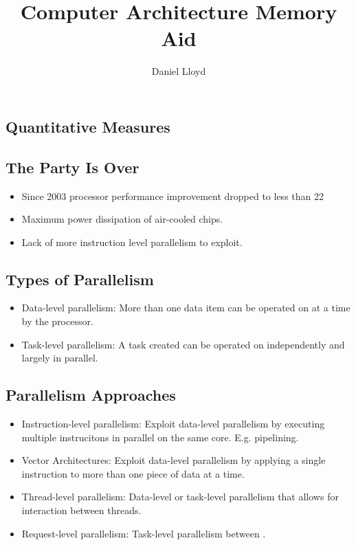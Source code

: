\documentclass[8pt]{extarticle}
\title{Computer Architecture Memory Aid}
\author{Daniel Lloyd}
\begin{document}

\begin{multicols}{3}

\section{Quantitative Measures}

\subsection{The Party Is Over}

\begin{itemize}
  \item Since 2003 processor performance improvement dropped to less
    than 22%
  \item Maximum power dissipation of air-cooled chips.
  \item Lack of more instruction level parallelism to exploit.
\end{itemize}

\subsection{Types of Parallelism}
\begin{itemize}
  \item Data-level parallelism: More than one data item can be operated on at a
    time by the processor.
  \item Task-level parallelism: A task created can be operated on independently
    and largely in parallel.
\end{itemize}

\subsection{Parallelism Approaches}
\begin{itemize}
  \item Instruction-level parallelism: Exploit data-level parallelism by
    executing multiple instrucitons in parallel on the same core.
    E.g. pipelining.
  \item Vector Architectures: Exploit data-level parallelism by applying a
    single instruction to more than one piece of data at a time.
  \item Thread-level parallelism: Data-level or task-level parallelism
    that allows for interaction between threads.
  \item Request-level parallelism: Task-level parallelism between .
\end{itemize}


\end{multicols}
\end{document}

